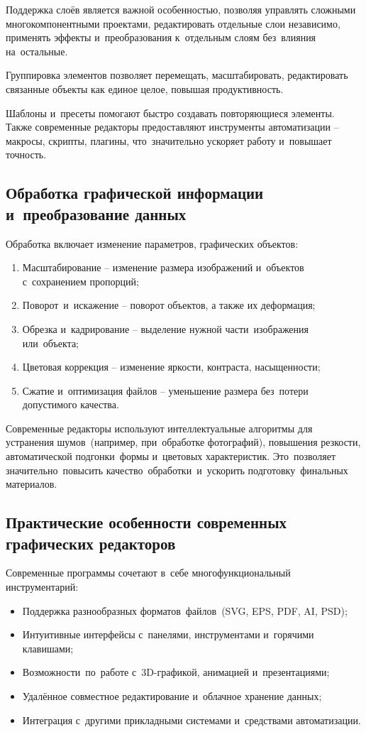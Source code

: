 \documentclass{ou}
\begin{document}
Поддержка слоёв является важной особенностью, позволяя управлять сложными многокомпонентными проектами, редактировать отдельные слои независимо, применять эффекты и~преобразования к~отдельным слоям без~влияния на~остальные.

Группировка элементов позволяет перемещать, масштабировать, редактировать связанные объекты как единое целое, повышая продуктивность.

Шаблоны и~пресеты помогают быстро создавать повторяющиеся элементы. Также современные редакторы предоставляют инструменты автоматизации -- макросы, скрипты, плагины, что~значительно ускоряет работу и~повышает точность.
\subsection{Обработка графической информации и~преобразование данных}

Обработка включает изменение параметров, графических объектов:
\begin{enumerate}[leftmargin=0em, itemindent=3.75em, nosep, label=\arabic*)]
  \item Масштабирование -- изменение размера изображений и~объектов с~сохранением пропорций;
  \item Поворот~и~искажение -- поворот объектов, а также их деформация;
  \item Обрезка и~кадрирование -- выделение нужной части~изображения или~объекта;
  \item Цветовая коррекция -- изменение яркости, контраста, насыщенности;
  \item Сжатие и~оптимизация файлов -- уменьшение размера без~потери допустимого качества.
\end{enumerate}

Современные редакторы используют интеллектуальные алгоритмы для устранения шумов~(например, при~обработке фотографий), повышения резкости, автоматической подгонки~формы и~цветовых характеристик. Это~позволяет значительно~повысить качество~обработки~и~ускорить подготовку~финальных материалов.
\subsection{Практические особенности современных графических редакторов}
Современные программы сочетают в~себе многофункциональный инструментарий:
\begin{itemize}[label=-, leftmargin=0em, itemindent=3.35em, nosep]
\item Поддержка разнообразных форматов~файлов~(SVG, EPS, PDF, AI, PSD);
\item Интуитивные интерфейсы с~панелями, инструментами и~горячими клавишами;
\item Возможности~по~работе с~3D-графикой, анимацией и~презентациями;
\item Удалённое совместное редактирование и~облачное хранение данных;
\item Интеграция с~другими прикладными системами и~средствами автоматизации.
\end{itemize}
\end{document}
